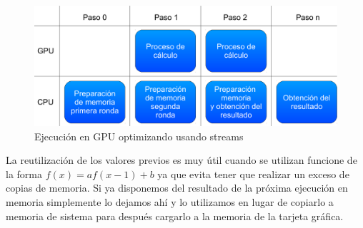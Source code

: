 \begin{figure}
	\centering
	\includegraphics[width=1\textwidth]{images/ejec_gpu_complex.pdf}
	\caption{Ejecución en GPU optimizando usando streams}\label{fig:cudaejecavanzada}
\end{figure}

La reutilización de los valores previos es muy útil cuando se utilizan funcione de la forma $f(x) = af(x-1)+b$ ya que evita tener que realizar un exceso de copias de memoria. Si ya disponemos del resultado de la próxima ejecución en memoria simplemente lo dejamos ahí y lo utilizamos en lugar de copiarlo a memoria de sistema para después cargarlo a la memoria de la tarjeta gráfica.


